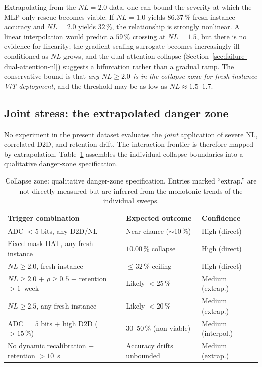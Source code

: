 Extrapolating from the $NL=2.0$ data, one can bound the severity at which the MLP-only rescue becomes viable.  If $NL=1.0$ yields $86.37\,\%$ fresh-instance accuracy and $NL=2.0$ yields $32\,\%$, the relationship is strongly nonlinear.  A linear interpolation would predict a $59\,\%$ crossing at $NL=1.5$, but there is no evidence for linearity; the gradient-scaling surrogate becomes increasingly ill-conditioned as $NL$ grows, and the dual-attention collapse (Section~\ref{sec:failure-dual-attention-nl}) suggests a bifurcation rather than a gradual ramp.  The conservative bound is that \emph{any $NL \ge 2.0$ is in the collapse zone for fresh-instance ViT deployment}, and the threshold may be as low as $NL \approx 1.5$--$1.7$.

\subsection{Joint stress: the extrapolated danger zone}

No experiment in the present dataset evaluates the \emph{joint} application of severe NL, correlated D2D, and retention drift.  The interaction frontier is therefore mapped by extrapolation.  Table~\ref{tab:danger-zone} assembles the individual collapse boundaries into a qualitative danger-zone specification.

\begin{table}[t]
    \centering
    \caption{Collapse zone: qualitative danger-zone specification.  Entries marked ``extrap.'' are not directly measured but are inferred from the monotonic trends of the individual sweeps.}
    \label{tab:danger-zone}
    \small
    \begin{tabular}{@{}lll@{}}
        \toprule
        \textbf{Trigger combination} & \textbf{Expected outcome} & \textbf{Confidence} \\
        \midrule
        ADC $< 5$ bits, any D2D/NL & Near-chance ($\sim$10\,\%) & High (direct) \\
        Fixed-mask HAT, any fresh instance & $10.00\,\%$ collapse & High (direct) \\
        $NL \ge 2.0$, fresh instance & $\le 32\,\%$ ceiling & High (direct) \\
        $NL \ge 2.0$ + $\rho \ge 0.5$ + retention $>1$~week & Likely $< 25\,\%$ & Medium (extrap.) \\
        $NL \ge 2.5$, any fresh instance & Likely $< 20\,\%$ & Medium (extrap.) \\
        ADC $=5$ bits + high D2D ($>15\,\%$) & $30$--$50\,\%$ (non-viable) & Medium (interpol.) \\
        No dynamic recalibration + retention $>10$~s & Accuracy drifts unbounded & Medium (extrap.) \\
        \bottomrule
    \end{tabular}
\end{table}

